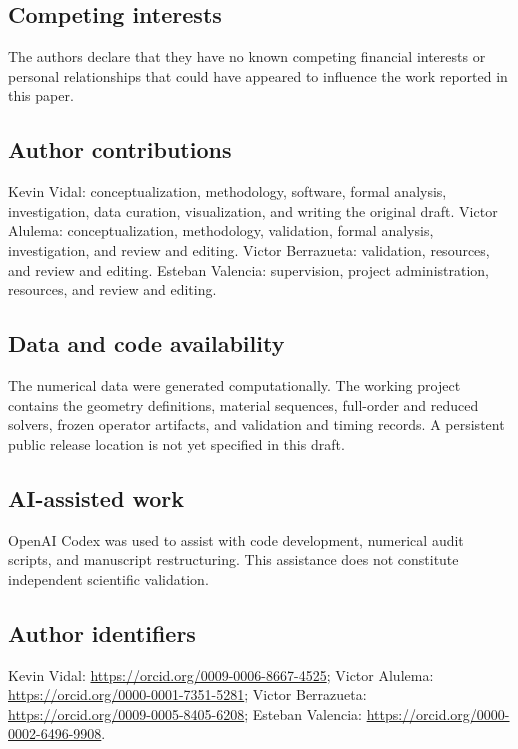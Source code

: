 \documentclass[pdflatex,sn-basic,Numbered]{sn-jnl}
\begin{document}
\subsection*{Competing interests}
The authors declare that they have no known competing financial interests or
personal relationships that could have appeared to influence the work
reported in this paper.

\subsection*{Author contributions}
Kevin Vidal: conceptualization, methodology, software, formal analysis,
investigation, data curation, visualization, and writing the original draft.
Victor Alulema: conceptualization, methodology, validation, formal analysis,
investigation, and review and editing. Victor Berrazueta: validation,
resources, and review and editing. Esteban Valencia: supervision, project
administration, resources, and review and editing.

\subsection*{Data and code availability}
The numerical data were generated computationally. The working project
contains the geometry definitions, material sequences, full-order and reduced
solvers, frozen operator artifacts, and validation and timing records.
A persistent public release location is not yet specified in this draft.

\subsection*{AI-assisted work}
OpenAI Codex was used to assist with code development, numerical audit scripts,
and manuscript restructuring. This assistance does not constitute independent
scientific validation.

\subsection*{Author identifiers}
Kevin Vidal: \url{https://orcid.org/0009-0006-8667-4525};
Victor Alulema: \url{https://orcid.org/0000-0001-7351-5281};
Victor Berrazueta: \url{https://orcid.org/0009-0005-8405-6208};
Esteban Valencia: \url{https://orcid.org/0000-0002-6496-9908}.


\end{document}
